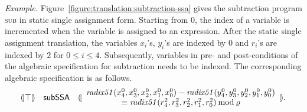 \noindent
\emph{Example.}
Figure~\ref{figure:translation:subtraction-ssa} gives the subtraction program
\textsc{sub} in static single assignment form. Starting from $0$, the
index of a variable is incremented when the variable is assigned to an
expression. After the static single assignment translation, the
variables ${x}_i$'s, ${y}_i$'s are indexed by $0$ and
${r}_i$'s are indexed by $2$ for $0 \leq i \leq 4$. 
Subsequently, variables in pre- and post-conditions of the algebraic
specification for subtraction needs to be indexed. The
corresponding algebraic specification is as follows.
\[
\begin{array}{rcl}
{(\!|}{\top}{|\!)} &
\mbox{\textsf{subSSA}} &
{(\!|}{
   \begin{array}{c}
     \mathit{radix51}({x}^0_4, {x}^0_3, {x}^0_2, {x}^0_1, {x}^0_0) -
     \mathit{radix51}({y}^0_4, {y}^0_3, {y}^0_2, {y}^0_1, {y}^0_0) \\
     \equiv
     \mathit{radix51}({r}^2_4, {r}^2_3, {r}^2_2, {r}^2_1, {r}^2_0)
     \mathbin{\textmd{mod}} \varrho
   \end{array}
}{|\!)}.
\end{array}
\]


